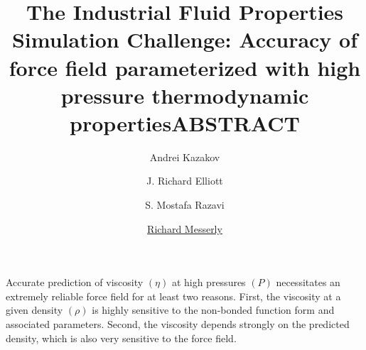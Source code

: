 \documentclass[11pt,a4paper]{article}
\begin{document}
	\thispagestyle{empty}
	\title{\Large \textbf{The Industrial Fluid Properties Simulation Challenge: Accuracy of force field parameterized with high pressure thermodynamic properties}}
	\author[1]{\large {Andrei Kazakov}}
	\author[2]{\large {J. Richard Elliott}}
	\author[2]{\large {S. Mostafa Razavi}}
	\author[1]{\large {\underline{Richard Messerly}}}%

	
	
	\date{} %
	\maketitle\thispagestyle{empty} %
	\begin{center}
		\title{\textbf{ABSTRACT}}\centering{}
	\end{center}
	\justify
	
	
	
	
	
	Accurate prediction of viscosity $(\eta)$ at high pressures $(P)$ necessitates an extremely reliable force field for at least two reasons. First, the viscosity at a given density $(\rho)$ is highly sensitive to the non-bonded function form and associated parameters. Second, the viscosity depends strongly on the predicted density, which is also very sensitive to the force field. 
	
\end{document}
